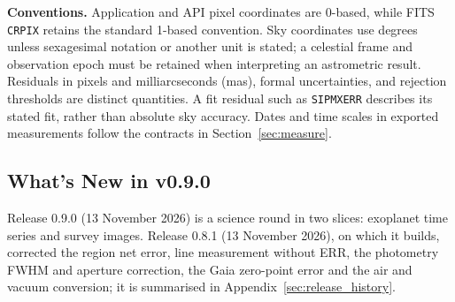 \documentclass[11pt,a4paper]{article}
\newcommand{\code}[1]{\texttt{\small #1}}
\begin{document}
    \textbf{Conventions.} Application and API pixel coordinates are 0-based, while FITS \code{CRPIX} retains the standard 1-based convention. Sky coordinates use degrees unless sexagesimal notation or another unit is stated; a celestial frame and observation epoch must be retained when interpreting an astrometric result. Residuals in pixels and milliarcseconds (mas), formal uncertainties, and rejection thresholds are distinct quantities. A fit residual such as \code{SIPMXERR} describes its stated fit, rather than absolute sky accuracy. Dates and time scales in exported measurements follow the contracts in Section~\ref{sec:measure}.

    \subsection{What's New in v0.9.0}
    \label{sec:new_090}

    Release 0.9.0 (13 November 2026) is a science round in two slices: exoplanet time series and survey images. Release 0.8.1 (13 November 2026), on which it builds, corrected the region net error, line measurement without ERR, the photometry FWHM and aperture correction, the Gaia zero-point error and the air and vacuum conversion; it is summarised in Appendix~\ref{sec:release_history}.
\end{document}
